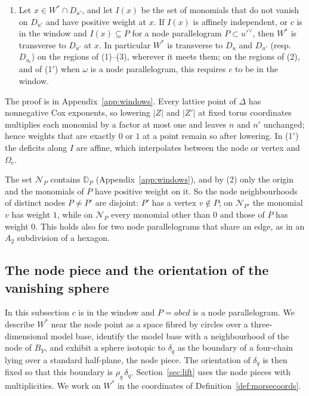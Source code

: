 \begin{lemma}
\begin{enumerate}
$0,n_a,n_b,n_c$ are one and all other weights are zero.
\item Let $x\in W^*\cap D_{u'}$, and let $I(x)$ be the set of monomials that do not vanish on $D_{u'}$ and have positive
weight at $x$. If $I(x)$ is affinely independent, or $c$ is in the window and $I(x)\subseteq P$ for a node parallelogram
$P\subset u'^\vee$, then $W^*$ is transverse to $D_{u'}$ at $x$. In particular $W^*$ is transverse to $D_u$ and $D_{u'}$
(resp.\ $D_{u_i}$) on the regions of (1)--(3), wherever it meets them; on the regions of (2), and of (1$'$) when $\omega$
is a node parallelogram, this requires $c$ to be in the window.
\end{enumerate}
\end{lemma}

The proof is in Appendix~\ref{app:windows}. Every lattice point of $\Delta$ has nonnegative Cox exponents, so lowering
$|Z|$ and $|Z'|$ at fixed torus coordinates multiplies each monomial by a factor at most one and leaves $n$ and $n'$
unchanged; hence weights that are exactly $0$ or $1$ at a point remain so after lowering. In (1$'$) the deficits along
$I$ are affine, which interpolates between the node or vertex and $\Omega_e$.

The set $\mathcal N_P$ contains $\mathbb D_P$ (Appendix~\ref{app:windows}), and by (2) only the origin and the monomials of $P$ have positive weight on it.
So the node neighbourhoods of distinct nodes $P\neq P'$ are disjoint: $P'$ has a vertex $v\notin P$; on $\mathcal N_{P'}$
the monomial $v$ has weight $1$, while on $\mathcal N_P$ every monomial other than $0$ and those of $P$ has weight $0$. This
holds also for two node parallelograms that share an edge, as in an $A_2$ subdivision of a hexagon.

\subsection{The node piece and the orientation of the vanishing sphere}\label{ssec:nodepiece}

In this subsection $c$ is in the window and $P=abcd$ is a node parallelogram. We describe $W^*$ near the node point as a
space fibred by circles over a three-dimensional model base, identify the model base with a neighbourhood of the node
of $B_Y$, and exhibit a sphere isotopic to $\delta_q$ as the boundary of a four-chain lying over a standard half-plane,
the node piece. The orientation of $\delta_q$ is then fixed so that this boundary is $\rho_q\,\delta_q$.
Section~\ref{sec:lift} uses the node pieces with multiplicities. We work on $W^*$ in the coordinates of
Definition~\ref{def:morsecoords}.

